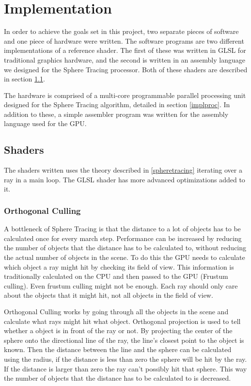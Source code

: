 \chapter{Implementation}

	In order to achieve the goals set in this project, two separate pieces of
	software and one piece of hardware were written. The software programs are
	two different implementations of a reference shader. The first of these was
	written in GLSL for traditional graphics hardware, and the second is written
	in an assembly language we designed for the Sphere Tracing processor. Both of
	these shaders are described in section \ref{implshader}.
	
	The hardware is comprised of a multi-core programmable parallel processing
	unit designed for the Sphere Tracing algorithm, detailed in section
	\ref{implproc}. In addition to these, a simple assembler program was written
	for the assembly language used for the GPU.
	
	\section{Shaders} \label{implshader}

		The shaders written uses the theory described in \ref{spheretracing}
		iterating over a ray in a main loop. The GLSL shader has more advanced
		optimizations added to it.

		\subsection{Orthogonal Culling}

			A bottleneck of Sphere Tracing is that the distance to a lot of objects
			has to be calculated once for every march step. Performance can be
			increased by reducing the number of objects that the distance has 
			to be calculated to, without reducing the actual number of objects in the
			scene. To do this the GPU needs to calculate which object a ray might hit
			by checking its field of view. This information is traditionally
			calculated on the CPU and then passed to the GPU (Frustum culling). Even
			frustum culling might not be enough. Each ray should only care about the
			objects that it might hit, not all objects in the field of view.

			Orthogonal Culling works by going through all the objects in the scene
			and calculate what rays might hit what object. Orthogonal projection is
			used to tell whether a object is in front of the ray or not. By
			projecting the center of the sphere onto the directional line of the ray,
			the line's closest point to the object is known. Then the distance
			between the line and the sphere can be calculated using the radius, if
			the distance is less than zero the sphere will be hit by the ray. If the
			distance is larger than zero the ray can't possibly hit that sphere. This
			way the number of objects that the distance has to be calculated to is
			decreased.

